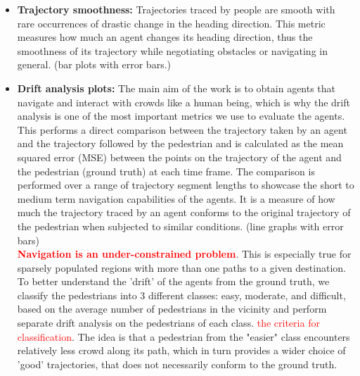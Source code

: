 \begin{itemize}
        \item \textbf{Trajectory smoothness:} Trajectories traced by people are smooth with rare occurrences of drastic change in the heading direction. This metric measures how much an agent changes its heading direction, thus the smoothness of its trajectory while negotiating obstacles or navigating in general. (bar plots with error bars.)
        \item \textbf{Drift analysis plots: }The main aim of the work is to obtain agents that navigate and interact with crowds like a human being, which is why the drift analysis is one of the most important metrics we use to evaluate the agents. This performs a direct comparison between the trajectory taken by an agent and the trajectory followed by the pedestrian and is calculated as the mean squared error (MSE) between the points on the trajectory of the agent and the pedestrian (ground truth) at each time frame. The comparison is performed over a range of trajectory segment lengths to showcase the short to medium term navigation capabilities of the agents. It is a measure of how much the trajectory traced by an agent conforms to the original trajectory of the pedestrian when subjected to similar conditions. (line graphs with error bars)\\
        \textbf{\textcolor{red}{Navigation is an under-constrained problem}}. This is especially true for sparsely populated regions with more than one paths to a given destination. To better understand the 'drift' of the agents from the ground truth, we classify the pedestrians into 3 different classes: easy, moderate, and difficult, based on the average number of pedestrians in the vicinity and perform separate drift analysis on the pedestrians of each class. \textcolor{red}{the criteria for classification}. The idea is that a pedestrian from the "easier" class encounters relatively less crowd along its path, which in turn provides a wider choice of 'good' trajectories, that does not necessarily conform to the ground truth. 
\end{itemize}

